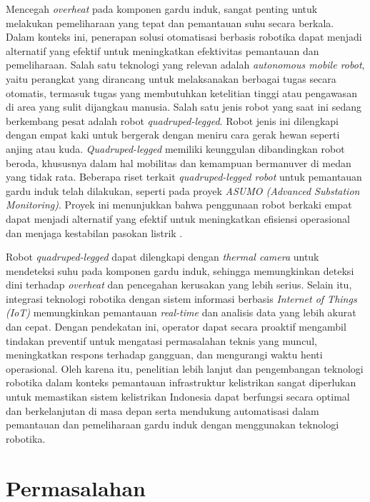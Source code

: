 Mencegah \emph{overheat} pada komponen gardu induk, sangat penting untuk melakukan pemeliharaan yang tepat dan pemantauan suhu secara berkala. Dalam konteks ini, penerapan solusi otomatisasi berbasis robotika dapat menjadi alternatif yang efektif untuk meningkatkan efektivitas pemantauan dan pemeliharaan. Salah satu teknologi yang relevan adalah \emph{autonomous mobile robot}, yaitu perangkat yang dirancang untuk melaksanakan berbagai tugas secara otomatis, termasuk tugas yang membutuhkan ketelitian tinggi atau pengawasan di area yang sulit dijangkau manusia. Salah satu jenis robot yang saat ini sedang berkembang pesat adalah robot \emph{quadruped-legged}. Robot jenis ini dilengkapi dengan empat kaki untuk bergerak dengan meniru cara gerak hewan seperti anjing atau kuda. \emph{Quadruped-legged} memiliki keunggulan dibandingkan robot beroda, khususnya dalam hal mobilitas dan kemampuan bermanuver di medan yang tidak rata. Beberapa riset terkait \emph{quadruped-legged robot} untuk pemantauan gardu induk telah dilakukan, seperti pada proyek \emph{ASUMO (Advanced Substation Monitoring)}. Proyek ini menunjukkan bahwa penggunaan robot berkaki empat dapat menjadi alternatif yang efektif untuk meningkatkan efisiensi operasional dan menjaga kestabilan pasokan listrik \cite{ASUMO2023}.  

Robot \emph{quadruped-legged}  dapat dilengkapi dengan \emph{thermal camera} untuk mendeteksi suhu pada komponen gardu induk, sehingga memungkinkan deteksi dini terhadap \emph{overheat} dan pencegahan kerusakan yang lebih serius. Selain itu, integrasi teknologi robotika dengan sistem informasi berbasis \emph{Internet of Things (IoT)} memungkinkan pemantauan \emph{real-time} dan analisis data yang lebih akurat dan cepat. Dengan pendekatan ini, operator dapat secara proaktif mengambil tindakan preventif untuk mengatasi permasalahan teknis yang muncul, meningkatkan respons terhadap gangguan, dan mengurangi waktu henti operasional. Oleh karena itu, penelitian lebih lanjut dan pengembangan teknologi robotika dalam konteks pemantauan infrastruktur kelistrikan sangat diperlukan untuk memastikan sistem kelistrikan Indonesia dapat berfungsi secara optimal dan berkelanjutan di masa depan serta mendukung automatisasi dalam pemantauan dan pemeliharaan gardu induk dengan menggunakan teknologi robotika.

\section{Permasalahan}

